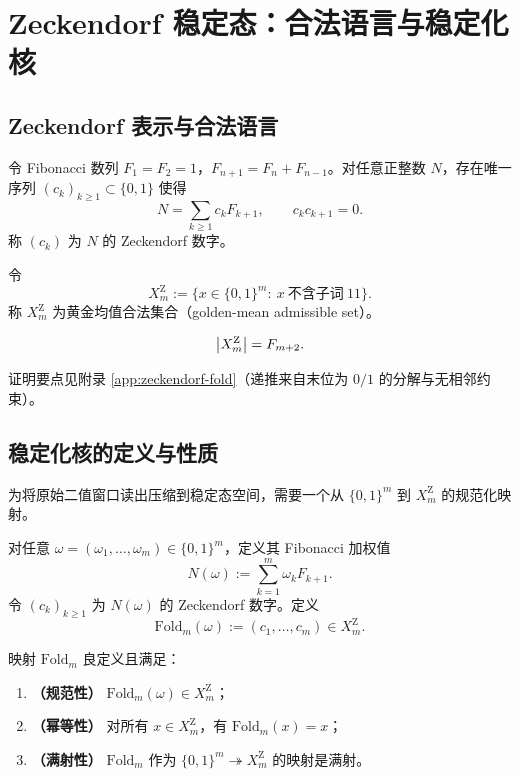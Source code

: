 \section{Zeckendorf 稳定态：合法语言与稳定化核}

\subsection{Zeckendorf 表示与合法语言}

\begin{definition}[Zeckendorf 表示]\label{def:zeckendorf}
令 Fibonacci 数列 $F_1=F_2=1$，$F_{n+1}=F_n+F_{n-1}$。对任意正整数 $N$，存在唯一序列 $(c_k)_{k\ge 1}\subset\{0,1\}$ 使得
\[
N=\sum_{k\ge 1} c_k F_{k+1},\qquad c_k c_{k+1}=0.
\]
称 $(c_k)$ 为 $N$ 的 Zeckendorf 数字。
\end{definition}

\begin{definition}\label{def:zeckendorf-language}
令
\[
X_m^{\mathrm Z}:=\{x\in\{0,1\}^m:\ x\ \text{不含子词}\ 11\}.
\]
称 $X_m^{\mathrm Z}$ 为黄金均值合法集合（golden-mean admissible set）。
\end{definition}

\begin{theorem}[计数]\label{thm:zeckendorf-count}
\[
\left\lvert X_m^{\mathrm Z}\right\rvert=F_{m+2}.
\]
\end{theorem}

\begin{remark}
证明要点见附录 \ref{app:zeckendorf-fold}（递推来自末位为 $0/1$ 的分解与无相邻约束）。
\end{remark}

\subsection{稳定化核的定义与性质}

为将原始二值窗口读出压缩到稳定态空间，需要一个从 $\{0,1\}^m$ 到 $X_m^{\mathrm Z}$ 的规范化映射。

\begin{definition}\label{def:fold}
对任意 $\omega=(\omega_1,\dots,\omega_m)\in\{0,1\}^m$，定义其 Fibonacci 加权值
\[
N(\omega):=\sum_{k=1}^{m}\omega_k F_{k+1}.
\]
令 $(c_k)_{k\ge 1}$ 为 $N(\omega)$ 的 Zeckendorf 数字。定义
\[
\mathrm{Fold}_m(\omega):=(c_1,\dots,c_m)\in X_m^{\mathrm Z}.
\]
\end{definition}

\begin{theorem}\label{thm:fold-properties}
映射 $\mathrm{Fold}_m$ 良定义且满足：
\begin{enumerate}
  \item \textbf{（规范性）} $\mathrm{Fold}_m(\omega)\in X_m^{\mathrm Z}$；
  \item \textbf{（幂等性）} 对所有 $x\in X_m^{\mathrm Z}$，有 $\mathrm{Fold}_m(x)=x$；
  \item \textbf{（满射性）} $\mathrm{Fold}_m$ 作为 $\{0,1\}^m\twoheadrightarrow X_m^{\mathrm Z}$ 的映射是满射。
\end{enumerate}
\end{theorem}

